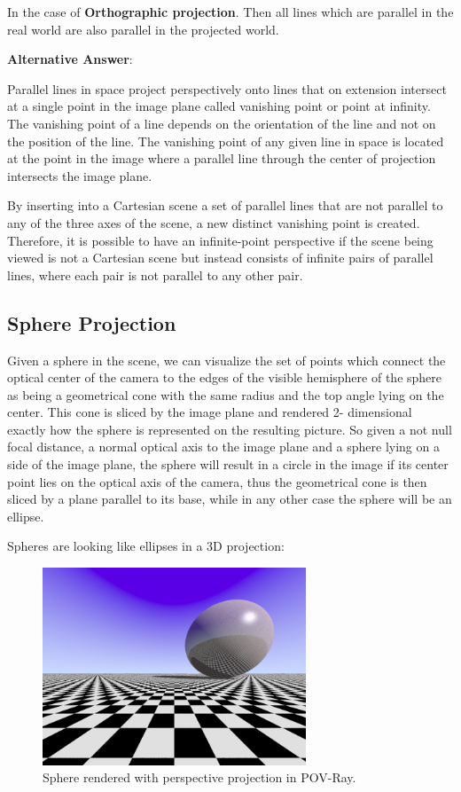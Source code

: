 \documentclass[a4paper,12pt]{article}
\begin{document}
	In the case of \textbf{Orthographic projection}. Then all lines which are parallel in the real world are also parallel in the projected world.
	
	\textbf{Alternative Answer}:
	
	Parallel lines in space project perspectively onto lines that on extension intersect at a single point in the image plane called vanishing point or point at infinity. The vanishing point of a line depends on the orientation of the line and not on the position of the line. The vanishing point of any given line in space is located at the point in the image where a parallel line through the center of projection intersects the image plane.
	
By inserting into a Cartesian scene a set of parallel lines that are not parallel to any of the three axes of the scene, a new distinct vanishing point is created. Therefore, it is possible to have an infinite-point perspective if the scene being viewed is not a Cartesian scene but instead consists of infinite pairs of parallel lines, where each pair is not parallel to any other pair.

	
	\subsection{Sphere Projection}
	
	Given a sphere in the scene, we can visualize the set of points which connect the optical center of the camera to the edges of the visible hemisphere of the sphere as being a geometrical cone with the same radius and the top angle lying on the center. This cone is sliced by the image plane and rendered 2- dimensional exactly how the sphere is represented on the resulting picture.
So given a not null focal distance, a normal optical axis to the image plane and a sphere lying on a side of the image plane, the sphere will result in a circle in the image if its center point lies on the optical axis of the camera, thus the geometrical cone is then sliced by a plane parallel to its base, while in any other case the sphere will be an ellipse.


	
	Spheres are looking like ellipses in a 3D projection:
	
	\begin{figure}[h!]
		\centering
		\includegraphics[width=0.7\textwidth]{E03.png}
		\caption{Sphere rendered with perspective projection in POV-Ray.}
	\end{figure}
	
	
\end{document}
